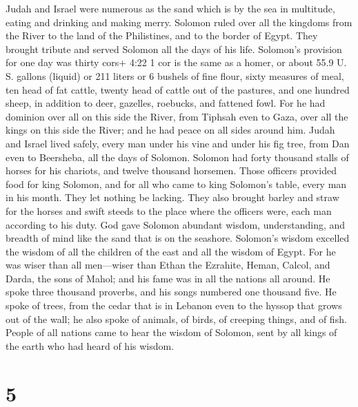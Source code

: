  Judah and Israel were numerous as the sand which is by the
sea in multitude, eating and drinking and making merry. 
Solomon ruled over all the kingdoms from the River to the land of the
Philistines, and to the border of Egypt. They brought tribute and served
Solomon all the days of his life.  Solomon's provision for
one day was thirty cors+ 4:22 1 cor is the same as a homer, or about
55.9 U. S. gallons (liquid) or 211 liters or 6 bushels of fine flour,
sixty measures of meal,  ten head of fat cattle, twenty
head of cattle out of the pastures, and one hundred sheep, in addition
to deer, gazelles, roebucks, and fattened fowl.  For he had
dominion over all on this side the River, from Tiphsah even to Gaza,
over all the kings on this side the River; and he had peace on all sides
around him.  Judah and Israel lived safely, every man under
his vine and under his fig tree, from Dan even to Beersheba, all the
days of Solomon.  Solomon had forty thousand stalls of
horses for his chariots, and twelve thousand horsemen. 
Those officers provided food for king Solomon, and for all who came to
king Solomon's table, every man in his month. They let nothing be
lacking.  They also brought barley and straw for the horses
and swift steeds to the place where the officers were, each man
according to his duty.  God gave Solomon abundant wisdom,
understanding, and breadth of mind like the sand that is on the
seashore.  Solomon's wisdom excelled the wisdom of all the
children of the east and all the wisdom of Egypt.  For he
was wiser than all men---wiser than Ethan the Ezrahite, Heman, Calcol,
and Darda, the sons of Mahol; and his fame was in all the nations all
around.  He spoke three thousand proverbs, and his songs
numbered one thousand five.  He spoke of trees, from the
cedar that is in Lebanon even to the hyssop that grows out of the wall;
he also spoke of animals, of birds, of creeping things, and of fish.
 People of all nations came to hear the wisdom of Solomon,
sent by all kings of the earth who had heard of his wisdom.

\hypertarget{section-4}{%
\section{5}\label{section-4}}


